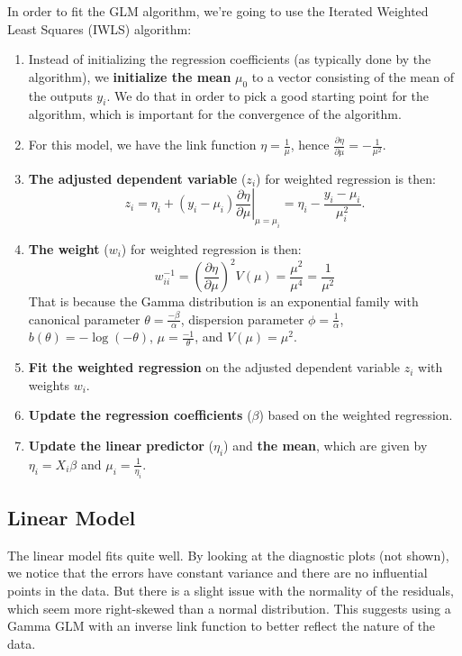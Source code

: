\documentclass[10pt, a4paper]{article}
\begin{document}
In order to fit the GLM algorithm, we're going to use the Iterated Weighted Least Squares (IWLS) algorithm:
\begin{enumerate}
  \item Instead of initializing the regression coefficients (as typically done by the algorithm), we \textbf{initialize the mean} $\mu_0$ to a vector consisting of the mean of the outputs $y_i$. We do that in order to pick a good starting point for the algorithm, which is important for the convergence of the algorithm.
  \item For this model, we have the link function $\eta = \frac{1}{\mu}$, hence $\frac{\partial \eta}{\partial \mu} = -\frac{1}{\mu^2}$.
  \item \textbf{The adjusted dependent variable} ($z_i$) for weighted regression is then:
        \[
          z_i = \eta_i + (y_i - \mu_i) \left.\frac{\partial \eta}{\partial \mu}\right|_{\mu = \mu_i} = \eta_i - \frac{y_i - \mu_i}{\mu_i^2}.
        \]
  \item \textbf{The weight} ($w_i$) for weighted regression is then:
        \[
          w_{ii}^{-1} = \left(\frac{\partial \eta}{\partial \mu}\right)^2 V(\mu) = \frac{\mu^2}{\mu^4} = \frac{1}{\mu^2}
        \]
        That is because the Gamma distribution is an exponential family with canonical parameter $\theta = \frac{- \beta}{\alpha}$, dispersion parameter $\phi = \frac{1}{\alpha}$, $b(\theta) = - \log (-\theta)$, $\mu = \frac{-1}{\theta}$, and $V(\mu) = \mu^2$.
  \item \textbf{Fit the weighted regression} on the adjusted dependent variable $z_i$ with weights $w_i$.
  \item \textbf{Update the regression coefficients} ($\beta$) based on the weighted regression.
  \item \textbf{Update the linear predictor} ($\eta_i$) and \textbf{the mean}, which are given by $\eta_i = X_i \beta$ and $\mu_i = \frac{1}{\eta_i}$.
\end{enumerate}

\subsection{Linear Model}

The linear model fits quite well. By looking at the diagnostic plots (not shown), we notice that the errors have constant variance and there are no influential points in the data. But there is a slight issue with the normality of the residuals, which seem more right-skewed than a normal distribution. This suggests using a Gamma GLM with an inverse link function to better reflect the nature of the data.
\end{document}
